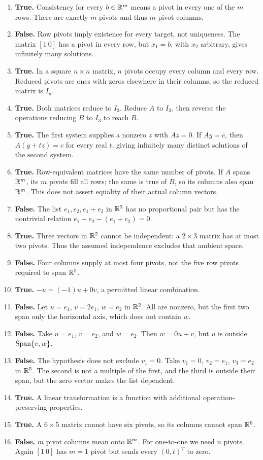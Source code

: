 \begin{enumerate}[label=(\alph*)]
when free variables exist. Take $A=[0]$.
\item \textbf{True.} Consistency for every $b\in\mathbb{R}^m$ means a pivot
in every one of the $m$ rows. There are exactly $m$ pivots and thus
$m$ pivot columns.
\item \textbf{False.} Row pivots imply existence for every target,
not uniqueness. The matrix $[1\ 0]$ has a pivot in every row, but
$x_1=b$, with $x_2$ arbitrary, gives infinitely many solutions.
\item \textbf{True.} In a square $n\times n$ matrix, $n$ pivots
occupy every column and every row. Reduced pivots are ones with zeros
elsewhere in their columns, so the reduced matrix is $I_n$.
\item \textbf{True.} Both matrices reduce to $I_3$. Reduce $A$ to
$I_3$, then reverse the operations reducing $B$ to $I_3$ to reach $B$.
\item \textbf{True.} The first system supplies a nonzero $z$ with
$Az=0$. If $Ay=c$, then $A(y+tz)=c$ for every real $t$,
giving infinitely many distinct solutions of the second system.
\item \textbf{True.} Row-equivalent matrices have the same number
of pivots. If $A$ spans $\mathbb{R}^m$, its $m$ pivots fill all rows;
the same is true of $B$, so its columns also span $\mathbb{R}^m$.
This does not assert equality of their actual column vectors.
\item \textbf{False.} The list $e_1,e_2,e_1+e_2$ in $\mathbb{R}^3$ has
no proportional pair but has the nontrivial relation
$e_1+e_2-(e_1+e_2)=0$.
\item \textbf{True.} Three vectors in $\mathbb{R}^2$ cannot be independent:
a $2\times3$ matrix has at most two pivots. Thus the assumed
independence excludes that ambient space.
\item \textbf{False.} Four columns supply at most four pivots, not
the five row pivots required to span $\mathbb{R}^5$.
\item \textbf{True.} $-u=(-1)u+0v$, a permitted linear combination.
\item \textbf{False.} Let $u=e_1$, $v=2e_1$, $w=e_2$ in $\mathbb{R}^2$.
All are nonzero, but the first two span only the horizontal axis,
which does not contain $w$.
\item \textbf{False.} Take $u=e_1$, $v=e_2$, and $w=e_2$.
Then $w=0u+v$, but $u$ is outside $\operatorname{Span}\{v,w\}$.
\item \textbf{False.} The hypothesis does not exclude $v_1=0$.
Take $v_1=0$, $v_2=e_1$, $v_3=e_2$ in $\mathbb{R}^5$. The second
is not a multiple of the first, and the third is outside their span,
but the zero vector makes the list dependent.
\item \textbf{True.} A linear transformation is a function with
additional operation-preserving properties.
\item \textbf{True.} A $6\times5$ matrix cannot have six pivots,
so its columns cannot span $\mathbb{R}^6$.
\item \textbf{False.} $m$ pivot columns mean onto $\mathbb{R}^m$.
For one-to-one we need $n$ pivots. Again $[1\ 0]$ has $m=1$
pivot but sends every $(0,t)^T$ to zero.
\end{enumerate}

